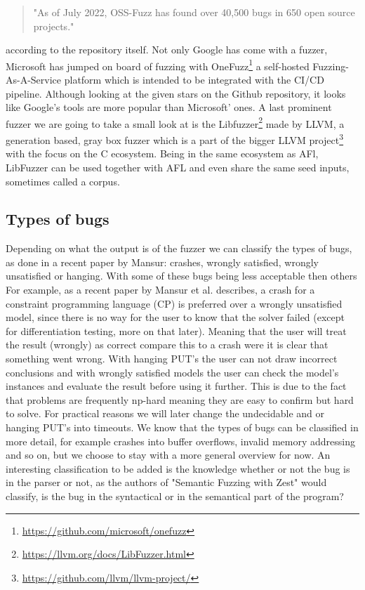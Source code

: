 \begin{quote} 
	"As of July 2022, OSS-Fuzz has found over 40,500 bugs in 650 open source projects."
\end{quote} according to the repository itself. 
Not only Google has come with a fuzzer, Microsoft has jumped on board of fuzzing with OneFuzz\footnote{\url{https://github.com/microsoft/onefuzz}} a self-hosted Fuzzing-As-A-Service platform which is intended to be integrated with the CI/CD pipeline. Although looking at the given stars on the Github repository, it looks like Google's tools are more popular than Microsoft' ones.
A last prominent fuzzer we are going to take a small look at is the Libfuzzer\footnote{\url{https://llvm.org/docs/LibFuzzer.html}} made by LLVM, a generation based, gray box fuzzer which is a part of the bigger LLVM project\footnote{\url{https://github.com/llvm/llvm-project/}} with the focus on the C ecosystem. Being in the same ecosystem as AFl, LibFuzzer can be used together with AFL and even share the same seed inputs, sometimes called a corpus.

\subsection{Types of bugs} 
Depending on what the output is of the fuzzer we can classify the types of bugs, as done in a recent paper\cite{1mansur2020detecting} by Mansur: crashes, wrongly satisfied, wrongly unsatisfied or hanging. With some of these bugs being less acceptable then others 
For example, as a recent paper\cite{1mansur2020detecting} by Mansur et al. describes, a crash for a constraint programming language (CP) is preferred over a wrongly unsatisfied model, since there is no way for the user to know that the solver failed (except for differentiation testing, more on that later). Meaning that the user will treat the result (wrongly) as correct compare this to a crash were it is clear that something went wrong.
With hanging PUT's the user can not draw incorrect conclusions and with wrongly satisfied models the user can check the model's instances and evaluate the result before using it further. This is due to the fact that problems are frequently np-hard meaning they are easy to confirm but hard to solve. For practical reasons we will later change the undecidable and or hanging PUT's into timeouts. We know that the types of bugs can be classified in more detail, for example crashes into buffer overflows, invalid memory addressing and so on, but we choose to stay with a more general overview for now. An interesting classification to be added is the knowledge whether or not the bug is in the parser or not, as the authors of "Semantic Fuzzing with Zest"\cite{22SemanticFuzzing} would classify, is the bug in the syntactical or in the semantical part of the program?


